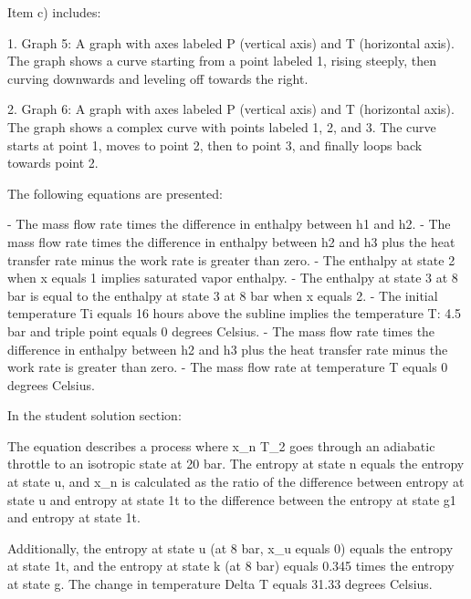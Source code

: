 Item c) includes:

1. Graph 5: A graph with axes labeled P (vertical axis) and T (horizontal axis). The graph shows a curve starting from a point labeled 1, rising steeply, then curving downwards and leveling off towards the right.

2. Graph 6: A graph with axes labeled P (vertical axis) and T (horizontal axis). The graph shows a complex curve with points labeled 1, 2, and 3. The curve starts at point 1, moves to point 2, then to point 3, and finally loops back towards point 2.

The following equations are presented:

- The mass flow rate times the difference in enthalpy between h1 and h2.
- The mass flow rate times the difference in enthalpy between h2 and h3 plus the heat transfer rate minus the work rate is greater than zero.
- The enthalpy at state 2 when x equals 1 implies saturated vapor enthalpy.
- The enthalpy at state 3 at 8 bar is equal to the enthalpy at state 3 at 8 bar when x equals 2.
- The initial temperature Ti equals 16 hours above the subline implies the temperature T: 4.5 bar and triple point equals 0 degrees Celsius.
- The mass flow rate times the difference in enthalpy between h2 and h3 plus the heat transfer rate minus the work rate is greater than zero.
- The mass flow rate at temperature T equals 0 degrees Celsius.

In the student solution section:

The equation describes a process where x_n T_2 goes through an adiabatic throttle to an isotropic state at 20 bar. The entropy at state n equals the entropy at state u, and x_n is calculated as the ratio of the difference between entropy at state u and entropy at state 1t to the difference between the entropy at state g1 and entropy at state 1t.

Additionally, the entropy at state u (at 8 bar, x_u equals 0) equals the entropy at state 1t, and the entropy at state k (at 8 bar) equals 0.345 times the entropy at state g. The change in temperature Delta T equals 31.33 degrees Celsius.